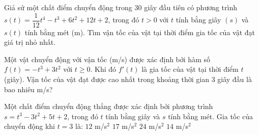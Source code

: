 \begin{bt}%

	Giả sử một chất điểm chuyển động trong $30$ giây đầu tiên có phương trình $s(t)=\dfrac{1}{12}t^4-t^3+6t^2+12t+2$, trong đó $t>0$ với $t$ tính bằng giây $(s)$ và $s(t)$ tính bằng mét (m). Tìm vận tốc của vật tại thời điểm gia tốc của vật đạt giá trị nhỏ nhất.
\end{bt}

\begin{bt}%
	Một vật chuyển động với vận tốc (m/s) được xác định bởi hàm số $f(t) = -t^3 + 3t^2$ với $t \geq 0$. Khi đó $f'(t)$ là gia tốc của vật tại thời điểm $t$ (giây). Vận tốc của vật đạt được cao nhất trong khoảng thời gian $3$ giây đầu là  bao nhiêu m/s?
\end{bt}

\begin{ex}%
	Một chất  điểm chuyển động thẳng được xác định bởi phương trình $s=t^3-3t^2+5t+2$, trong đó $t$ tính bằng giây và $s$ tính bằng mét. Gia tốc của chuyển động khi $t=3$ là:
	\choice 
		{\True $12$  m/s$^2$}
		{$17$  m/s$^2$}
		 {$24$ m/s$^2$}
		{$14$ m/s$^2$} 
\end{ex}

